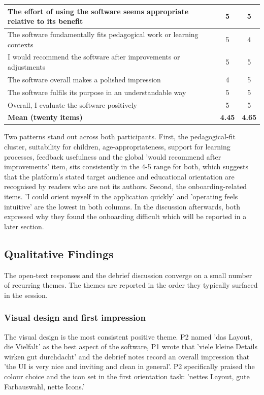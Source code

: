 \begin{table}
\begin{tabularx}{\textwidth}{|X|c|c|}
    The effort of using the software seems appropriate relative to its benefit & 5             & 5             \\\hline
    The software fundamentally fits pedagogical work or learning contexts      & 5             & 4             \\\hline
    I would recommend the software after improvements or adjustments           & 5             & 5             \\\hline
    The software overall makes a polished impression                           & 4             & 5             \\\hline
    The software fulfils its purpose in an understandable way                  & 5             & 5             \\\hline
    Overall, I evaluate the software positively                                & 5             & 5             \\\hline
    \textbf{Mean (twenty items)}                                               & \textbf{4.45} & \textbf{4.65} \\\hline
  \end{tabularx}
\end{table}

Two patterns stand out across both participants. First, the pedagogical-fit cluster, suitability for children, 
age-appropriateness, support for learning processes, feedback usefulness and the global 'would recommend after improvements' 
item, sits consistently in the 4-5 range for both, which suggests that the platform's stated target audience and educational 
orientation are recognised by readers who are not its authors. Second, the onboarding-related items.
'I could orient myself in the application quickly' and 'operating feels intuitive' are the lowest in both columns. 
In the discussion afterwards, both expressed why they found the onboarding difficult which will be reported in a later 
section.

\subsection{Qualitative Findings}
The open-text responses and the debrief discussion converge on a small number of recurring themes. 
The themes are reported in the order they typically surfaced in the session.

\subsubsection*{Visual design and first impression}
The visual design is the most consistent positive theme. P2 named 'das Layout, die Vielfalt' as the best 
aspect of the software, P1 wrote that 'viele kleine Details wirken gut durchdacht' and the debrief notes record an 
overall impression that 'the UI is very nice and inviting and clean in general'.
P2 specifically praised the colour choice and the icon set in the first orientation task: 'nettes Layout, gute Farbauswahl, nette Icons.'

